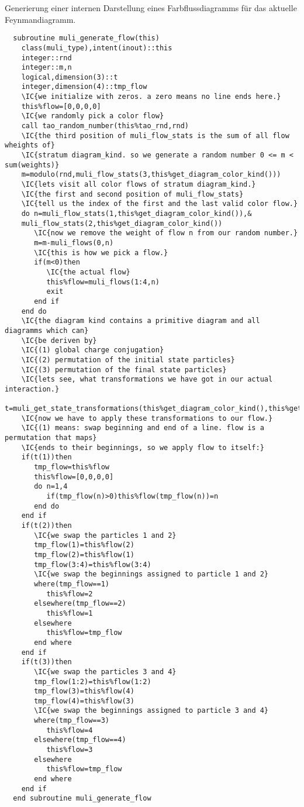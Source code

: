 Generierung einer internen Darstellung eines Farbflussdiagramms für das aktuelle Feynman\-dia\-gramm.
\begin{Verbatim}
  subroutine muli_generate_flow(this)
    class(muli_type),intent(inout)::this
    integer::rnd
    integer::m,n
    logical,dimension(3)::t
    integer,dimension(4)::tmp_flow
    \IC{we initialize with zeros. a zero means no line ends here.}
    this%flow=[0,0,0,0]
    \IC{we randomly pick a color flow}
    call tao_random_number(this%tao_rnd,rnd)
    \IC{the third position of muli_flow_stats is the sum of all flow wheights of}
    \IC{stratum diagram_kind. so we generate a random number 0 <= m < sum(weights)}
    m=modulo(rnd,muli_flow_stats(3,this%get_diagram_color_kind()))
    \IC{lets visit all color flows of stratum diagram_kind.}
    \IC{the first and second position of muli_flow_stats}
    \IC{tell us the index of the first and the last valid color flow.}
    do n=muli_flow_stats(1,this%get_diagram_color_kind()),&
    muli_flow_stats(2,this%get_diagram_color_kind())
       \IC{now we remove the weight of flow n from our random number.}
       m=m-muli_flows(0,n)
       \IC{this is how we pick a flow.}
       if(m<0)then
          \IC{the actual flow}
          this%flow=muli_flows(1:4,n)
          exit
       end if
    end do
    \IC{the diagram kind contains a primitive diagram and all diagramms which can}
    \IC{be deriven by}
    \IC{(1) global charge conjugation}
    \IC{(2) permutation of the initial state particles}
    \IC{(3) permutation of the final state particles}
    \IC{lets see, what transformations we have got in our actual interaction.}
    t=muli_get_state_transformations(this%get_diagram_color_kind(),this%get_lha_flavors())
    \IC{now we have to apply these transformations to our flow.}
    \IC{(1) means: swap beginning and end of a line. flow is a permutation that maps}
    \IC{ends to their beginnings, so we apply flow to itself:}
    if(t(1))then
       tmp_flow=this%flow
       this%flow=[0,0,0,0]
       do n=1,4
          if(tmp_flow(n)>0)this%flow(tmp_flow(n))=n
       end do
    end if
    if(t(2))then
       \IC{we swap the particles 1 and 2}
       tmp_flow(1)=this%flow(2)
       tmp_flow(2)=this%flow(1)
       tmp_flow(3:4)=this%flow(3:4)
       \IC{we swap the beginnings assigned to particle 1 and 2}
       where(tmp_flow==1)
          this%flow=2
       elsewhere(tmp_flow==2)
          this%flow=1
       elsewhere
          this%flow=tmp_flow
       end where
    end if
    if(t(3))then
       \IC{we swap the particles 3 and 4}
       tmp_flow(1:2)=this%flow(1:2)
       tmp_flow(3)=this%flow(4)
       tmp_flow(4)=this%flow(3)
       \IC{we swap the beginnings assigned to particle 3 and 4}
       where(tmp_flow==3)
          this%flow=4
       elsewhere(tmp_flow==4)
          this%flow=3
       elsewhere
          this%flow=tmp_flow
       end where
    end if
  end subroutine muli_generate_flow
\end{Verbatim}

